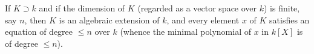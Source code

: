 If $K \supset k$ and if the dimension of $K$ (regarded as a vector space over $k$) is finite, say $n$, then $K$ is an algebraic extension of $k$, and every element $x$ of $K$ satisfies an equation of degree $\leq n$ over $k$ (whence the minimal polynomial of $x$ in $k[X]$ is of degree $\leq n$).
